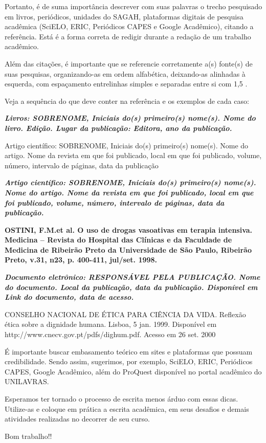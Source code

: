 \documentclass[12pt,article,oneside,a4paper]{abntex2}
\begin{document}
Portanto, é de suma importância descrever com suas palavras o trecho pesquisado em livros, periódicos, unidades do SAGAH, plataformas digitais de pesquisa acadêmica (SciELO, ERIC, Periódicos CAPES e Google Acadêmico), citando a referência. Está é a forma correta de redigir durante a redação de um trabalho acadêmico.

Além das citações, é importante que se referencie corretamente a(s) fonte(s) de suas pesquisas, organizando-as em ordem alfabética, deixando-as alinhadas à esquerda, com espaçamento entrelinhas simples e separadas entre si com 1,5 \citep{abnt2022}. 

Veja a sequência do que deve conter na referência e os exemplos de cada caso:\newline

\noindent \textbf{\textit{Livros: SOBRENOME, Iniciais do(s) primeiro(s) nome(s). Nome do livro. Edição. Lugar da publicação: Editora, ano da publicação.}}\newline

\noindent Artigo científico: SOBRENOME, Iniciais do(s) primeiro(s) nome(s). Nome do artigo. Nome
da revista em que foi publicado, local em que foi publicado, volume, número, intervalo de
páginas, data da publicação\newline

\noindent \textbf{\textit{Artigo científico: SOBRENOME, Iniciais do(s) primeiro(s) nome(s). Nome do artigo. Nome da revista em que foi publicado, local em que foi publicado, volume, número, intervalo de páginas, data da publicação.}}\newline

\noindent \textbf{ OSTINI, F.M.et al. O uso de drogas vasoativas em terapia intensiva. Medicina – Revista do Hospital das Clínicas e da Faculdade de Medicina de Ribeirão Preto da Universidade de São Paulo, Ribeirão Preto, v.31, n23, p. 400-411, jul/set. 1998.}\newline

\noindent \textbf{\textit{Documento eletrônico: RESPONSÁVEL PELA PUBLICAÇÃO. Nome do documento. Local da publicação, data da publicação. Disponível em Link do documento, data de acesso.}} 

\noindent CONSELHO NACIONAL DE ÉTICA PARA CIÊNCIA DA VIDA. Reflexão ética sobre a dignidade humana. Lisboa, 5 jan. 1999. Disponível em http://www.cnecv.gov.pt/pdfs/dighum.pdf. Acesso em 26 set. 2000\newline         

É importante buscar embasamento teórico em sites e plataformas que possuam credibilidade. Sendo assim, sugerimos, por exemplo, SciELO, ERIC, Periódicos CAPES, Google Acadêmico, além do ProQuest disponível no portal acadêmico do UNILAVRAS. 

Esperamos ter tornado o processo de escrita menos árduo com essas dicas. Utilize-as e coloque em prática a escrita acadêmica, em seus desafios e demais atividades realizadas no decorrer de seu curso.\newline

Bom trabalho!!





\end{document}
